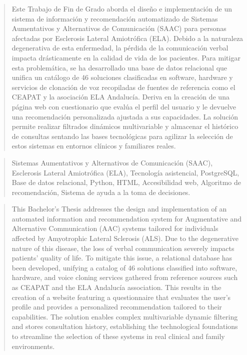 \documentclass[a4paper,12pt,twoside]{memoir}
\begin{document}
\frontmatter

\renewcommand*\abstractname{Resumen}
\begin{abstract}
Este Trabajo de Fin de Grado aborda el diseño e implementación de un sistema de información y recomendación automatizado de Sistemas Aumentativos y Alternativos de Comunicación (SAAC) para personas afectadas por Esclerosis Lateral Amiotrófica (ELA). Debido a la naturaleza degenerativa de esta enfermedad, la pérdida de la comunicación verbal impacta drásticamente en la calidad de vida de los pacientes. Para mitigar esta problemática, se ha desarrollado una base de datos relacional que unifica un catálogo de 46 soluciones clasificadas en software, hardware y servicios de clonación de voz recopiladas de fuentes de referencia como el CEAPAT y la asociación ELA Andalucía. Deriva en la creación de una página web con cuestionario que evalúa el perfil del usuario y le devuelve una recomendación personalizada ajustada a sus capacidades. La solución permite realizar filtrados dinámicos multivariable y almacenar el histórico de consultas sentando las bases tecnológicas para agilizar la selección de estos sistemas en entornos clínicos y familiares reales.
\end{abstract}

\renewcommand*\abstractname{Descriptores}
\begin{abstract}
Sistemas Aumentativos y Alternativos de Comunicación (SAAC), Esclerosis Lateral Amiotrófica (ELA), Tecnología asistencial, PostgreSQL, Base de datos relacional, Python, HTML, Accesibilidad web, Algoritmo de recomendación, Sistema de ayuda a la toma de decisiones.
\end{abstract}
\clearpage

\renewcommand*\abstractname{Abstract}
\begin{abstract}
This Bachelor's Thesis addresses the design and implementation of an automated information and recommendation system for Augmentative and Alternative Communication (AAC) systems tailored for individuals affected by Amyotrophic Lateral Sclerosis (ALS). Due to the degenerative nature of this disease, the loss of verbal communication severely impacts patients' quality of life. To mitigate this issue, a relational database has been developed, unifying a catalog of 46 solutions classified into software, hardware, and voice cloning services gathered from reference sources such as CEAPAT and the ELA Andalucía association. This results in the creation of a website featuring a questionnaire that evaluates the user's profile and provides a personalized recommendation tailored to their capabilities. The solution enables complex multivariable dynamic filtering and stores consultation history, establishing the technological foundations to streamline the selection of these systems in real clinical and family environments.
\end{abstract}
\end{document}
